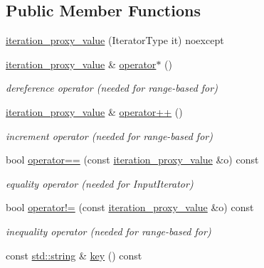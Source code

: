 \subsection*{Public Member Functions}
\begin{DoxyCompactItemize}
\item 
\hyperlink{classnlohmann_1_1detail_1_1iteration__proxy__value_a459dd8961b80b2089d8161c9aa466581}{iteration\+\_\+proxy\+\_\+value} (Iterator\+Type it) noexcept
\item 
\hyperlink{classnlohmann_1_1detail_1_1iteration__proxy__value}{iteration\+\_\+proxy\+\_\+value} \& \hyperlink{classnlohmann_1_1detail_1_1iteration__proxy__value_a10accadf05a172fdc69a016bec201e81}{operator$\ast$} ()
\begin{DoxyCompactList}\small\item\em dereference operator (needed for range-\/based for) \end{DoxyCompactList}\item 
\hyperlink{classnlohmann_1_1detail_1_1iteration__proxy__value}{iteration\+\_\+proxy\+\_\+value} \& \hyperlink{classnlohmann_1_1detail_1_1iteration__proxy__value_adf4db2aef31822f3a179435158a4de11}{operator++} ()
\begin{DoxyCompactList}\small\item\em increment operator (needed for range-\/based for) \end{DoxyCompactList}\item 
bool \hyperlink{classnlohmann_1_1detail_1_1iteration__proxy__value_af2b78a8b9c9276b07c928b21bb1e2d54}{operator==} (const \hyperlink{classnlohmann_1_1detail_1_1iteration__proxy__value}{iteration\+\_\+proxy\+\_\+value} \&o) const
\begin{DoxyCompactList}\small\item\em equality operator (needed for Input\+Iterator) \end{DoxyCompactList}\item 
bool \hyperlink{classnlohmann_1_1detail_1_1iteration__proxy__value_a646dbb2b1842f44f42ee1e14245b8595}{operator!=} (const \hyperlink{classnlohmann_1_1detail_1_1iteration__proxy__value}{iteration\+\_\+proxy\+\_\+value} \&o) const
\begin{DoxyCompactList}\small\item\em inequality operator (needed for range-\/based for) \end{DoxyCompactList}\item 
const \hyperlink{namespacenlohmann_1_1detail_a1ed8fc6239da25abcaf681d30ace4985ab45cffe084dd3d20d928bee85e7b0f21}{std\+::string} \& \hyperlink{classnlohmann_1_1detail_1_1iteration__proxy__value_a614278e2eecdf088199fac275ce114b6}{key} () const

\end{DoxyCompactItemize}
